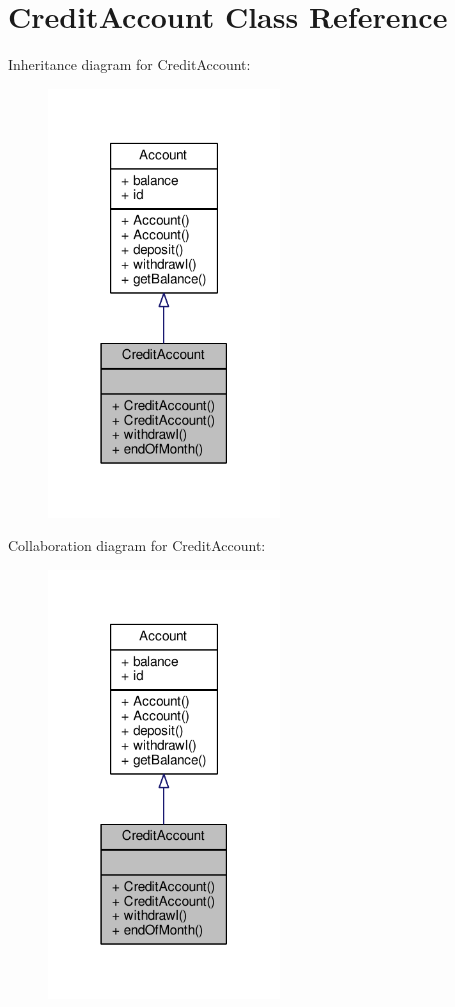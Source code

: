\hypertarget{classCreditAccount}{\section{Credit\-Account Class Reference}
\label{classCreditAccount}
}


Inheritance diagram for Credit\-Account\-:
\nopagebreak
\begin{figure}[H]
\begin{center}
\leavevmode
\includegraphics[width=174pt]{classCreditAccount__inherit__graph}
\end{center}
\end{figure}


Collaboration diagram for Credit\-Account\-:
\nopagebreak
\begin{figure}[H]
\begin{center}
\leavevmode
\includegraphics[width=174pt]{classCreditAccount__coll__graph}
\end{center}
\end{figure}
